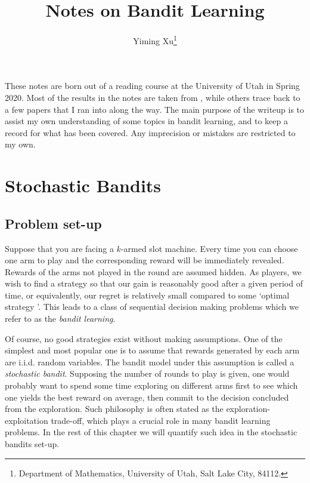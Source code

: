 \documentclass[letterpaper,10pt,openright,openany]{book}
\numberwithin{equation}{section}
\theoremstyle{plain}
\theoremstyle{definition}
\begin{document}
\title{Notes on Bandit Learning}
\date{}
\author{Yiming Xu\thanks{Department of Mathematics, University of Utah, Salt Lake City, 84112. }}
\maketitle

\vspace*{\fill}
These notes are born out of a reading course at the University of Utah in Spring 2020. Most of the results in the notes are taken from \cite{lattimore2018bandit}, while others trace back to a few papers that I ran into along the way. The main purpose of the writeup is to assist my own understanding of some topics in bandit learning, and to keep a record for what has been covered. Any imprecision or mistakes are restricted to my own. 
\vspace*{\fill}

\bigskip

\bigskip

\bigskip

\tableofcontents
\newpage

\chapter{Stochastic Bandits}\label{sec1}

\section{Problem set-up}\label{bg}

Suppose that you are facing a $k$-armed slot machine. Every time you can choose one arm to play and the corresponding reward will be immediately revealed. Rewards of the arms not played in the round are assumed hidden. As players, we wish to find a strategy so that our gain is reasonably good after a given period of time, or equivalently, our regret is relatively small compared to some `optimal strategy '. This leads to a class of sequential decision making problems which we refer to as the \emph{bandit learning}.  

Of course, no good strategies exist without making assumptions. One of the simplest and most popular one is to assume that rewards generated by each arm are i.i.d. random variables. The bandit model under this assumption is called a \emph{stochastic bandit}. Supposing the number of rounds to play is given, one would probably want to spend some time exploring on different arms first to see which one yields the best reward on average, then commit to the decision concluded from the exploration. Such philosophy is often stated as the exploration-exploitation trade-off, which plays a crucial role in many bandit learning problems. In the rest of this chapter we will quantify such idea in the stochastic bandits set-up. 
\end{document}
